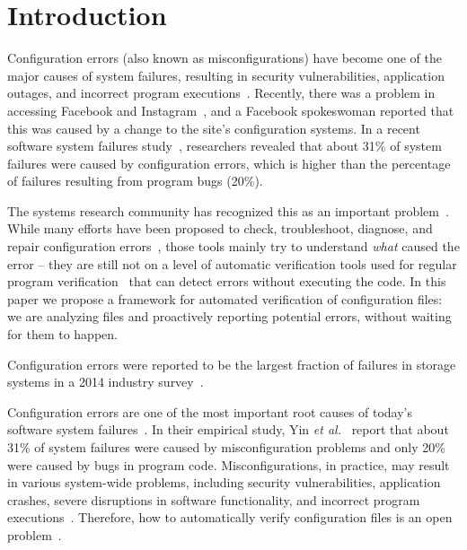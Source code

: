 \section{Introduction}
\label{sec-intro}

Configuration errors (also known as misconfigurations) have become
one of the major causes of system failures, resulting in security vulnerabilities,
application outages, and incorrect program executions~\cite{xu15systems, xu13do, xu15hey}. Recently, there was a problem in accessing  
Facebook and Instagram~\cite{mashableNews}, 
and a Facebook spokeswoman reported that 
this was caused by a change to the site's configuration systems.
In a recent software system failures study~\cite{yin11anempirical},
researchers revealed that about 31\% of system failures were caused by 
configuration errors, which is higher than the percentage of
failures resulting from program bugs (20\%).

The systems research community has recognized this as an important
problem~\cite{xu16early}. While many efforts have been proposed to check, troubleshoot, diagnose, and repair configuration 
errors~\cite{attariyan10automating,
su07autobash, whitaker04configuration},
those tools mainly try to understand {\emph{what}} caused the 
error -- they are still not on a level of
automatic verification tools used for regular program 
verification~\cite{Leino10Dafny, PiskacWZ14, BobotFMP15} that can
detect errors without executing the code. In this paper we propose
a framework for automated verification of configuration files: we are analyzing 
files and proactively reporting potential errors, without waiting for them to happen.




Configuration errors were
reported to be the largest fraction of failures in storage systems in a 2014 industry
survey~\cite{yin11anempirical}.

Configuration errors are one of the most important root causes of today's 
software system failures~\cite{xu15systems, yin11anempirical}.
In their empirical study, Yin {\em et al.}~\cite{yin11anempirical} report 
that about 31\% of system failures were caused by misconfiguration problems
and only 20\% were caused by bugs in program code. 
Misconfigurations, in practice, may result in various system-wide problems,
including security vulnerabilities, application crashes, severe disruptions
in software functionality, 
and incorrect program executions~\cite{xu15systems, xu13do, xu15hey}.  
Therefore, how to automatically verify configuration files is an open
problem~\cite{xu15systems}.

